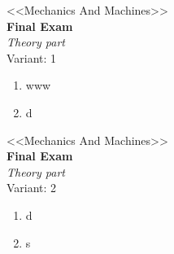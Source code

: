 \documentclass[12pt]{article}
\newcommand\ttask[2]{
	\begin{center}
		\LARGE <<Mechanics And Machines>> \\ \textbf{Final Exam} \\ \textit{Theory part} \\ Variant: #1
	\end{center}
#2
}
\def\BP{www}
\begin{document}
\ttask{1}{\begin{enumerate}
	\item \BP
	\item d
\end{enumerate}}

\ttask{2}{\begin{enumerate}
	\item d
	\item s
\end{enumerate}}
\end{document}
